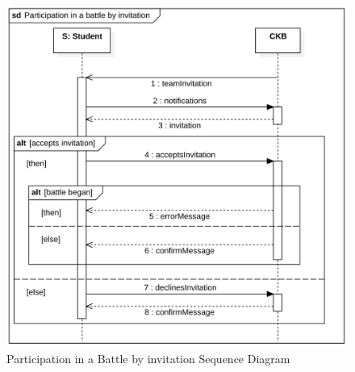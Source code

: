 \clearpage
\begin{figure}[h]
    \centering
    \includegraphics[scale=0.6]{images/SD/ParticipationBattleInvitationSD.png} 
    \caption{Participation in a Battle by invitation Sequence Diagram}
    \label{fig_SignUpTournamentSD}
\end{figure}



